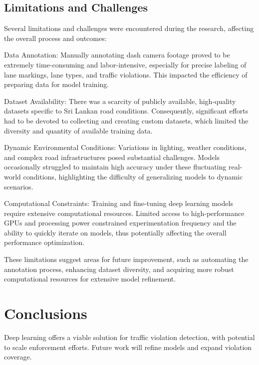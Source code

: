\documentclass[12pt,a4paper]{article}
\begin{document}
\subsection{Limitations and Challenges}
Several limitations and challenges were encountered during the research, affecting the overall process and outcomes:

Data Annotation:
Manually annotating dash camera footage proved to be extremely time-consuming and labor-intensive, especially for precise labeling of lane markings, lane types, and traffic violations. This impacted the efficiency of preparing data for model training.

Dataset Availability:
There was a scarcity of publicly available, high-quality datasets specific to Sri Lankan road conditions. Consequently, significant efforts had to be devoted to collecting and creating custom datasets, which limited the diversity and quantity of available training data.

Dynamic Environmental Conditions:
Variations in lighting, weather conditions, and complex road infrastructures posed substantial challenges. Models occasionally struggled to maintain high accuracy under these fluctuating real-world conditions, highlighting the difficulty of generalizing models to dynamic scenarios.

Computational Constraints:
Training and fine-tuning deep learning models require extensive computational resources. Limited access to high-performance GPUs and processing power constrained experimentation frequency and the ability to quickly iterate on models, thus potentially affecting the overall performance optimization.

These limitations suggest areas for future improvement, such as automating the annotation process, enhancing dataset diversity, and acquiring more robust computational resources for extensive model refinement.

\section{Conclusions}
Deep learning offers a viable solution for traffic violation detection, with potential to scale enforcement efforts. Future work will refine models and expand violation coverage.

\newpage
\end{document}
